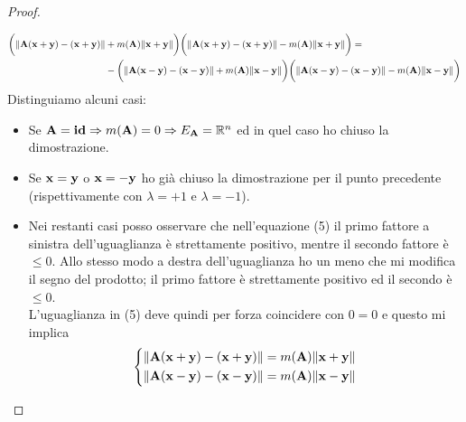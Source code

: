 \documentclass[10pt,a4paper]{book}
\begin{document}
\begin{proof}
\begin{itemize}
\begin{equation}
\begin{split}
\bigg( \norm{\vb{A(x+y) - (x+y)}} & + m(\vb{A})\norm{\vb{x+y}} \bigg) \bigg( \norm{\vb{A(x+y) - (x+y)}} - m(\vb{A}) \norm{\vb{x+y}} \bigg) = \\
& -\bigg( \norm{\vb{A(x-y) - (x-y)}} + m(\vb{A})\norm{\vb{x-y}} \bigg) \bigg( \norm{\vb{A(x-y) - (x-y)}} - m(\vb{A}) \norm{\vb{x-y}} \bigg)
\end{split}
\end{equation}
Distinguiamo alcuni casi: 
\begin{itemize}
\item Se $\vb{A} = \vb{id} \Rightarrow m(\vb{A}) = 0 \Rightarrow E_{\vb{A}} = \mathbb{R}^{n}$  ed in quel caso ho chiuso la dimostrazione.
\item Se $\vb{x} = \vb{y}$ o $\vb{x} = \vb{-y}$  ho già chiuso la dimostrazione per il punto precedente (rispettivamente con $\lambda = +1$ e $\lambda = -1$). 
\item Nei restanti casi posso osservare che nell'equazione (5) il primo fattore a sinistra dell'uguaglianza è strettamente positivo, mentre il secondo fattore è $\leq 0 $. Allo stesso modo a destra dell'uguaglianza ho un meno che mi modifica il segno del prodotto; il primo fattore è strettamente positivo ed il secondo è $\leq 0 $. \\ L'uguaglianza in (5) deve quindi per forza coincidere con $0=0$ e questo mi implica 
\begin{equation*}
  \left\{
    \begin{aligned}
      & \norm{\vb{A(x+y) - (x+y)}} = m(\vb{A})\norm{\vb{x+y}} \\
      & \norm{\vb{A(x-y) - (x-y)}} = m(\vb{A})\norm{\vb{x-y}} 
    \end{aligned}
  \right.
\end{equation*}


\end{itemize}
\end{itemize}
\end{proof}
\end{document}
